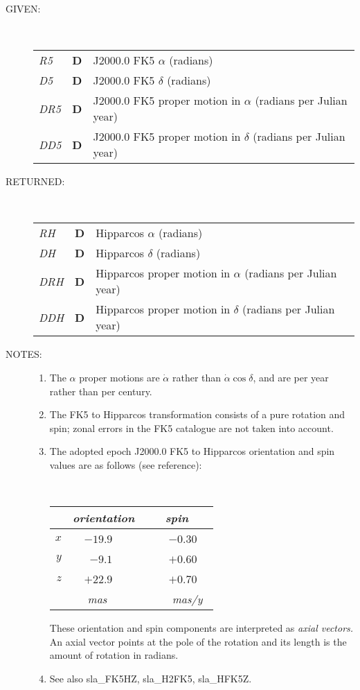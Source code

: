 \documentclass[11pt,twoside]{article}
\newlength{\oldspacing}
\newcommand{\args}[2]
{
  \goodbreak
  \setlength{\oldspacing}{\topsep}
  \setlength{\topsep}{0.3ex}
  \begin{description}
  \item[#1]:\\[1.5ex]
    \begin{tabular}{p{7em}p{6em}p{22em}}
      #2
    \end{tabular}
  \end{description}
  \setlength{\topsep}{\oldspacing}
}
\renewcommand{\args}[2]
   {
     \begin{description}
        \item[#1:]\\
        \begin{tabular}{p{7em}p{6em}l}
           #2
        \end{tabular}
     \end{description}
   }
\newcommand{\spec}[3]
{
  {\em {#1}} & {\bf \mbox{#2}} & {#3}
}
\newcommand{\notes}[1]
{
  \goodbreak
  \setlength{\oldspacing}{\topsep}
  \setlength{\topsep}{0.3ex}
  \begin{description}
    \item[NOTES]:
        #1
  \end{description}
  \setlength{\topsep}{\oldspacing}
}
\renewcommand{\notes}[1]
   {
      \begin{description}
         \item[NOTES:]
            #1
      \end{description}
   }
\begin{document}
\args{GIVEN}
{
 \spec{R5}{D}{J2000.0 FK5 $\alpha$ (radians)} \\
 \spec{D5}{D}{J2000.0 FK5 $\delta$ (radians)} \\
 \spec{DR5}{D}{J2000.0 FK5 proper motion in $\alpha$
                              (radians per Julian year)} \\
 \spec{DD5}{D}{J2000.0 FK5 proper motion in $\delta$
                              (radians per Julian year)}
}
\args{RETURNED}
{
 \spec{RH}{D}{Hipparcos $\alpha$ (radians)} \\
 \spec{DH}{D}{Hipparcos $\delta$ (radians)} \\
 \spec{DRH}{D}{Hipparcos proper motion in $\alpha$
                              (radians per Julian year)} \\
 \spec{DDH}{D}{Hipparcos proper motion in $\delta$
                              (radians per Julian year)}
}
\notes
{
 \begin{enumerate}
  \item The $\alpha$ proper motions are $\dot{\alpha}$ rather than
        $\dot{\alpha}\cos\delta$, and are per year rather than per century.
  \item The FK5 to Hipparcos
        transformation consists of a pure rotation and spin;
        zonal errors in the FK5 catalogue are not taken into account.
  \item The adopted epoch J2000.0 FK5 to Hipparcos orientation and spin
        values are as follows (see reference):

        \vspace{2ex}

        ~~~~~~~~~~~~
        \begin{tabular}{|r|r|r|} \hline
        &
        \multicolumn{1}{|c}{\it orientation} &
        \multicolumn{1}{|c|}{\it ~~~spin~~~} \\ \hline
        $x$ & $-19.9$~~~~ & ~$-0.30$~~ \\
        $y$ &  $-9.1$~~~~ & ~$+0.60$~~ \\
        $z$ & $+22.9$~~~~ & ~$+0.70$~~ \\ \hline
        & {\it mas}~~~~~ & ~{\it mas/y}~ \\ \hline
        \end{tabular}

        \vspace{3ex}

        These orientation and spin components are interpreted as
        {\it axial vectors.}  An axial vector points at the pole of
        the rotation and its length is the amount of rotation in radians.
  \item See also sla\_FK5HZ, sla\_H2FK5, sla\_HFK5Z.
 \end{enumerate}
}
\end{document}
